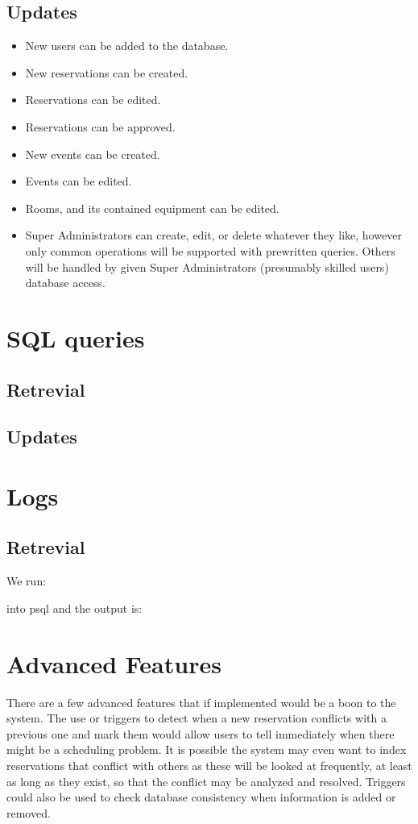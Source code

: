\documentclass{article}
\begin{document}
\subsection{Updates}
\begin{itemize}
\item New users can be added to the database.
\item New reservations can be created.
\item Reservations can be edited.
\item Reservations can be approved.
\item New events can be created.
\item Events can be edited.
\item Rooms, and its contained equipment can be edited.
\item Super Administrators can create, edit, or delete whatever they like,
however only common operations will be supported with prewritten queries.
Others will be handled by given Super Administrators (presumably skilled users) database access.
\end{itemize}

\section{SQL queries}
\subsection{Retrevial}


\subsection{Updates}

\section{Logs}
\subsection{Retrevial}
We run:
 
into psql and the output is:


\section{Advanced Features}
There are a few advanced features that if implemented would be a boon to the system. The use or triggers to detect
when a new reservation conflicts with a previous one and mark them would allow users to tell immediately when there
might be a scheduling problem. It is possible the system may even want to index reservations that conflict with others
as these will be looked at frequently, at least as long as they exist, so that the conflict may be analyzed and resolved.
Triggers could also be used to check database consistency when information is added or removed.
\end{document}

